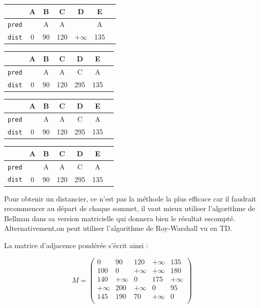 \documentclass[paper=a4, fontsize=11pt]{scrartcl} %
\numberwithin{equation}{section} %
\numberwithin{figure}{section} %
\numberwithin{table}{section} %
\begin{document}
\begin{tabular}{c|cccccc}
  & \textbf{A}	&\textbf{B}	&C	&D	&E	& \\
  \hline
  \texttt{pred} &	&A	&A	&	&A	&\\
  \texttt{dist} & 0	&90	&120	&$+\infty$	&135	&\\
\end{tabular}

\begin{tabular}{c|cccccc}
  & \textbf{A}	&\textbf{B}	&\textbf{C}	&D	&E	& \\
  \hline
  \texttt{pred} &	&A	&A	&C	&A	&\\
  \texttt{dist} & 0	&90	&120	&295	&135	&\\
\end{tabular}

\begin{tabular}{c|cccccc}
  & \textbf{A}	&\textbf{B}	&\textbf{C}	&D	&\textbf{E}	& \\
  \hline
  \texttt{pred} &	&A	&A	&C	&A	&\\
  \texttt{dist} & 0	&90	&120	&295	&135	&\\
\end{tabular}

\begin{tabular}{c|cccccc}
  & \textbf{A}	&\textbf{B}	&\textbf{C}	&\textbf{D}	&\textbf{E}	& \\
  \hline
  \texttt{pred} &	&A	&A	&C	&A	&\\
  \texttt{dist} & 0	&90	&120	&295	&135	&\\  
\end{tabular}

Pour obtenir un distancier, ce n'est pas la méthode la plus efficace car il faudrait recommencer au départ de chaque sommet, il vaut mieux utiliser l'algorithme de Bellman dans sa version matricielle qui donnera bien le résultat escompté. Alternativement,on peut utiliser l'algorithme de Roy-Warshall vu en TD. 

La matrice d'adjacence pondérée s'écrit ainsi :

\begin{equation}
  M = \begin{pmatrix}
    0 & 90 & 120 & +\infty & 135 \\
    100 & 0 & +\infty & +\infty & 180 \\
    140 & +\infty & 0 & 175 & +\infty \\
    +\infty & 200 & +\infty & 0 & 95 \\
    145 & 190 & 70 & +\infty & 0 \\
  \end{pmatrix}
\end{equation}
\end{document}

